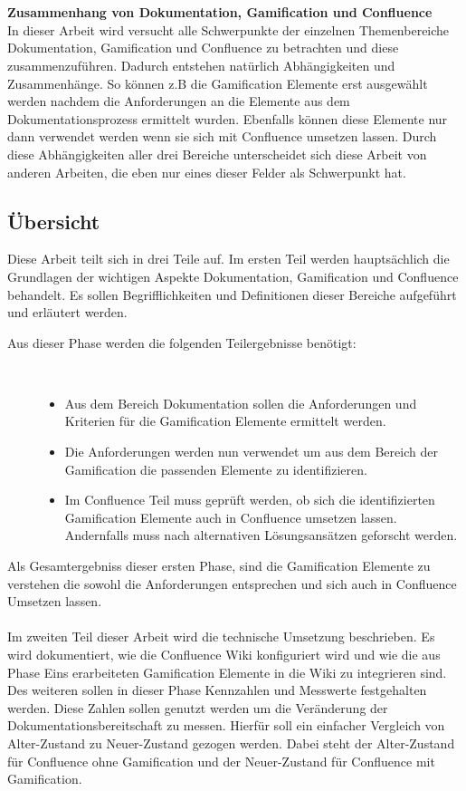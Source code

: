 \documentclass[a4paper,12pt]{scrartcl}
\begin{document}
\\\\
\textbf{Zusammenhang von Dokumentation, Gamification und Confluence}\\
In dieser Arbeit wird versucht alle Schwerpunkte der einzelnen Themenbereiche Dokumentation, Gamification und Confluence zu betrachten und diese zusammenzuführen. Dadurch entstehen natürlich Abhängigkeiten und Zusammenhänge. So können z.B die Gamification Elemente erst ausgewählt werden nachdem die Anforderungen an die Elemente aus dem Dokumentationsprozess ermittelt wurden. Ebenfalls können diese Elemente nur dann verwendet werden wenn sie sich mit Confluence umsetzen lassen. Durch diese Abhängigkeiten aller drei Bereiche unterscheidet sich diese Arbeit von anderen Arbeiten, die eben nur eines dieser Felder als Schwerpunkt hat.
\subsection{Übersicht}
Diese Arbeit teilt sich in drei Teile auf. Im ersten Teil werden hauptsächlich die Grundlagen der wichtigen Aspekte Dokumentation, Gamification und Confluence behandelt. Es sollen Begrifflichkeiten und Definitionen dieser Bereiche aufgeführt und erläutert werden. 
\begin{description}
   \item[Aus dieser Phase werden die folgenden Teilergebnisse benötigt:]~\par
   \begin{itemize}
      \item Aus dem Bereich Dokumentation sollen die Anforderungen und Kriterien für die Gamification Elemente ermittelt werden.
      \item Die Anforderungen werden nun verwendet um aus dem Bereich der Gamification die passenden Elemente zu identifizieren.
      \item Im Confluence Teil muss geprüft werden, ob sich die identifizierten Gamification Elemente auch in Confluence umsetzen lassen. Andernfalls muss nach alternativen Lösungsansätzen geforscht werden.
   \end{itemize}
\end{description}
Als Gesamtergebniss dieser ersten Phase, sind die Gamification Elemente zu verstehen die sowohl die Anforderungen entsprechen und sich auch in Confluence Umsetzen lassen.
\\\\
Im zweiten Teil dieser Arbeit wird die technische Umsetzung beschrieben. Es wird dokumentiert, wie die Confluence Wiki konfiguriert wird und wie die aus Phase Eins erarbeiteten Gamification Elemente in die Wiki zu integrieren sind. Des weiteren sollen in dieser Phase Kennzahlen und Messwerte festgehalten werden. Diese Zahlen sollen genutzt werden um die Veränderung der Dokumentationsbereitschaft zu messen. Hierfür soll ein einfacher Vergleich von Alter-Zustand zu Neuer-Zustand gezogen werden. Dabei steht der Alter-Zustand für Confluence ohne Gamification und der Neuer-Zustand für Confluence mit Gamification.
\end{document}

